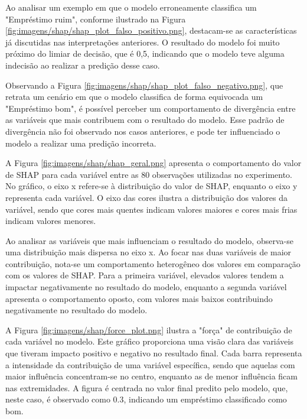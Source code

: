 Ao analisar um exemplo em que o modelo erroneamente classifica um "Empréstimo ruim", conforme ilustrado na Figura
 \ref{fig:imagens/shap/shap_plot_falso_positivo.png}, destacam-se as características já discutidas nas interpretações
  anteriores. O resultado do modelo foi muito próximo do limiar de decisão, que é 0,5, indicando que o modelo teve 
  alguma indecisão ao realizar a predição desse caso.



Observando a Figura \ref{fig:imagens/shap/shap_plot_falso_negativo.png}, que retrata um cenário em que o modelo
 classifica de forma equivocada um "Empréstimo bom", é possível perceber um comportamento de divergência entre 
 as variáveis que mais contribuem com o resultado do modelo. Esse padrão de divergência não foi observado nos
  casos anteriores, e pode ter influenciado o modelo a realizar uma predição incorreta.




A Figura \ref{fig:imagens/shap/shap_geral.png} apresenta o comportamento do valor de SHAP para cada variável
entre as 80 observações utilizadas no experimento. No gráfico, o eixo x refere-se à distribuição do valor de SHAP,
enquanto o eixo y representa cada variável. O eixo das cores ilustra a distribuição dos valores da variável, 
sendo que cores mais quentes indicam valores maiores e cores mais frias indicam valores menores.

Ao analisar as variáveis que mais influenciam o resultado do modelo, observa-se uma distribuição mais dispersa no eixo x.
 Ao focar nas duas variáveis de maior contribuição, nota-se um comportamento heterogêneo dos valores em comparação com 
 os valores de SHAP. Para a primeira variável, elevados valores tendem a impactar negativamente no resultado do modelo, 
 enquanto a segunda variável apresenta o comportamento oposto, com valores mais baixos contribuindo negativamente no
  resultado do modelo.




A Figura \ref{fig:imagens/shap/force_plot.png} ilustra a "força" de contribuição de cada variável no modelo.
 Este gráfico proporciona uma visão clara das variáveis que tiveram impacto positivo e negativo no resultado final.
  Cada barra representa a intensidade da contribuição de uma variável específica, sendo que aquelas com maior 
  influência concentram-se no centro, enquanto as de menor influência ficam nas extremidades. 
  A figura é centrada no valor final predito pelo modelo, que, neste caso, é observado como 0.3, 
  indicando um empréstimo classificado como bom.

